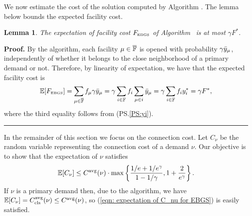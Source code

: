 \documentclass[oneside,final]{ucr}
\newtheorem{lemma}[theorem]{Lemma}
\newenvironment{proof}[1][Proof]{\textbf{#1.} }{\ \rule{0.5em}{0.5em}}
\begin{document}
\medskip

We now estimate the cost of the solution computed by Algorithm {\EBGS}. The lemma
below bounds the expected facility cost.


\begin{lemma} \label{lem: EBGS facility cost}
The expectation of facility cost $F_{\mbox{\tiny\rm EBGS}}$ of Algorithm~{\EBGS} is at most $\gamma F^\ast$.
\end{lemma}
\begin{proof}
By the algorithm, each facility $\mu\in \overline{\mathbb{F}}$ is opened with
probability $\gamma {\bar y}_{\mu}$, independently of whether it belongs to the
close neighborhood of a primary demand or not. Therefore, by
  linearity of expectation, we have that the expected facility cost is
%
\begin{equation*}
	\mathbb{E}[F_{\mbox{\tiny\rm EBGS}}] = \sum_{\mu \in \overline{\mathbb{F}}} f_\mu \gamma {\bar y}_{\mu} 
			= \gamma \sum_{i\in \mathbb{F}} f_i \sum_{\mu\in i} {\bar y}_{\mu} 
			= \gamma \sum_{i \in \mathbb{F}} f_i y_i^\ast = \gamma F^\ast,
\end{equation*}
%
where the third equality follows from (PS.\ref{PS:yi}).
\end{proof}


\medskip

In the remainder of this section we focus on the connection cost. Let $C_{\nu}$ be the
random variable representing the connection cost of a demand $\nu$. Our objective is
to show that the expectation of $\nu$ satisfies
%
\begin{equation}
\mathbb{E}[C_\nu]	\leq C^{{\mbox{\scriptsize\rm avg}}}(\nu) \cdot \max\left\{\frac{1/e+1/e^\gamma}{1-1/\gamma}, 1 + \frac{2}{e^\gamma}\right\}.
		\label{eqn: expectation of C_nu for EBGS}
\end{equation}
%
If $\nu$ is a primary demand then, due to the algorithm, we have $\mathbb{E}[C_{\nu}] =
C_{{\mbox{\scriptsize\rm cls}}}^{{\mbox{\scriptsize\rm avg}}}(\nu) \le C^{{\mbox{\scriptsize\rm avg}}}(\nu)$, so (\ref{eqn: expectation of C_nu for EBGS}) is
easily satisfied.
\end{document}

